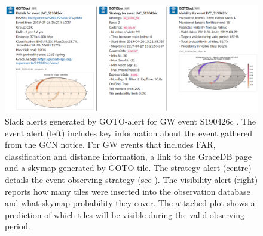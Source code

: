 \begin{colsection}
\begin{colsection}
\begin{figure}
    \begin{center}
        \includegraphics[width=\linewidth]{images/slack_alert_side2.png}
    \end{center}
    \caption[Slack alerts created by GOTO-alert for a GW event]{
        Slack alerts generated by GOTO-alert for GW event S190426c \citep{S190426c}.
        The event alert (left) includes key information about the event gathered from the GCN notice. For GW events that includes FAR, classification and distance information, a link to the GraceDB page and a skymap generated by GOTO-tile.
        The strategy alert (centre) details the event observing strategy (see ).
        The visibility alert (right) reports how many tiles were inserted into the observation database and what skymap probability they cover. The attached plot shows a prediction of which tiles will be visible during the valid observing period.
    }\label{fig:gotoalert_slack}
\end{figure}

\end{colsection}


\end{colsection}


\newpage
